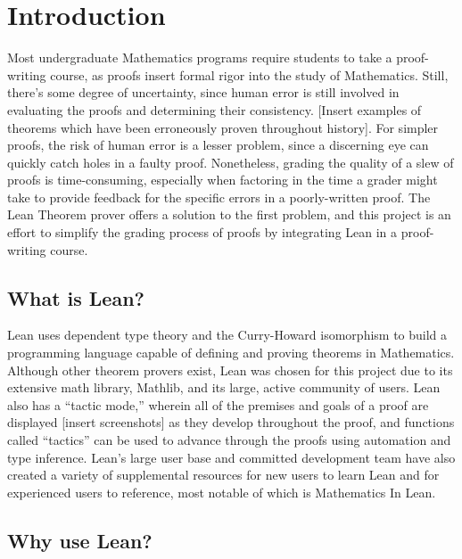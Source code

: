 
\chapter{Introduction}

Most undergraduate Mathematics programs require students to take 
a proof-writing course, as proofs insert formal rigor into the 
study of Mathematics. Still, there’s some degree of uncertainty, 
since human error is still involved in evaluating the proofs and 
determining their consistency. [Insert examples of theorems 
which have been erroneously proven throughout history]. For 
simpler proofs, the risk of human error is a lesser problem, 
since a discerning eye can quickly catch holes in a faulty proof. 
Nonetheless, grading the quality of a slew of proofs is 
time-consuming, especially when factoring in the time a grader 
might take to provide feedback for the specific errors in a 
poorly-written proof. The Lean Theorem prover offers a solution 
to the first problem, and this project is an effort to simplify 
the grading process of proofs by integrating Lean in a 
proof-writing course.

\section{What is Lean?}

Lean uses dependent type theory and the Curry-Howard isomorphism 
to build a programming language capable of defining and proving 
theorems in Mathematics. Although other theorem provers exist, 
Lean was chosen for this project due to its 
extensive math library, Mathlib, and its large, active community 
of users. Lean also has a “tactic mode,” wherein all of the 
premises and goals of a proof are displayed [insert screenshots] 
as they develop throughout the proof, and functions called 
“tactics” can be used to advance through the proofs using 
automation and type inference. Lean’s large user base and 
committed development team have also created a variety of 
supplemental resources for new users to learn Lean and for 
experienced users to reference, most notable of which is 
Mathematics In Lean.

\section{Why use Lean?}


